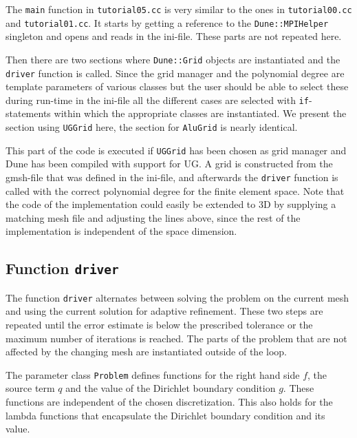 \documentclass[a4paper,12pt]{article}
\begin{document}
The \lstinline{main} function  in \lstinline{tutorial05.cc} is very similar to the ones
in \lstinline{tutorial00.cc} and \lstinline{tutorial01.cc}. It starts by getting a reference
to the \lstinline{Dune::MPIHelper} singleton and opens and reads in the ini-file. 
These parts are not repeated here.

Then there are two sections where \lstinline{Dune::Grid} objects are instantiated
and the \lstinline{driver} function is called. Since the grid manager
and the polynomial degree are template parameters of various classes
but the user should be able to select these during run-time in the ini-file all 
the different cases are selected with \lstinline{if}-statements within which
the appropriate classes are instantiated. We present the section using
\lstinline{UGGrid} here, the section for \lstinline{AluGrid} is nearly identical.


This part of the code is executed if \lstinline{UGGrid} has been chosen as grid manager
and Dune has been compiled with support for UG. A grid is constructed from the gmsh-file that
was defined in the ini-file, and afterwards the \lstinline{driver} function is called
with the correct polynomial degree for the finite element space. Note that the code of
the implementation could easily be extended to 3D by supplying a matching mesh file and
adjusting the lines above, since the rest of the implementation is independent of the
space dimension.

\subsection{Function \lstinline{driver}}

The function \lstinline{driver} alternates between solving the problem on the current mesh
and using the current solution for adaptive refinement. These two steps are repeated until
the error estimate is below the prescribed tolerance or the maximum number of iterations is
reached. The parts of the problem that are not affected by the changing mesh are instantiated
outside of the loop.


The parameter class \lstinline{Problem} defines functions for the right hand side
$f$, the source term $q$ and the value of the Dirichlet boundary condition $g$. These
functions are independent of the chosen discretization. This also holds for the lambda
functions that encapsulate the Dirichlet boundary condition and its value.
\end{document}
